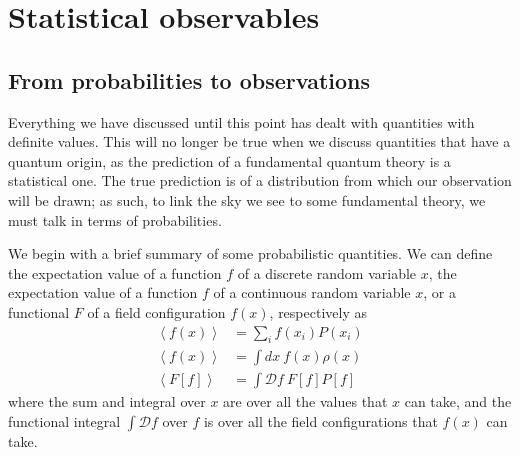 

\section{Statistical observables}
\subsection{From probabilities to observations}\label{corr_functions}
    Everything we have discussed until this point has dealt with quantities
    with definite values. This will no longer
    be true when we discuss quantities that have a quantum origin, as
    the prediction of a fundamental quantum theory is a statistical one.
    The true prediction is of a distribution from which our observation will be drawn;
    as such, to link the sky we see to some fundamental theory,
    we must talk in terms of probabilities.


    We begin with a brief summary of some probabilistic quantities.
    We can define the expectation value of a function $f$ of a discrete random variable $x$,
    the expectation value of a function $f$ of a continuous random variable $x$,
    or a functional $F$ of a field configuration $f(x)$, respectively as
    \begin{align}
        \left<f(x)\right> &= \sum_i f(x_i) P(x_i)\label{expectation_value_discrete}\\
        \left<f(x)\right> &= \int dx~f(x) \rho(x)\label{expectation_value_cont}\\
        \left<F\left[f\right]\right> &= \int \mathcal{D}f~F\left[f\right] P\left[f\right]\label{expectation_value_field}
    \end{align}
    where the sum and integral over $x$ are over all the values that $x$ can take,
    and the functional integral $\int \mathcal{D}f$ over $f$ is over all the field configurations
    that $f(x)$ can take.


